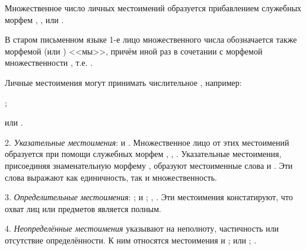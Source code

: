 Множественное число личных местоимений образуется прибавлением служебных морфем , ,  или .

В старом письменном языке 1-е лицо множественного числа обозначается также морфемой  (или ) <<мы>>, причём иной раз в сочетании с морфемой множественности , т.е. .

Личные местоимения могут принимать числительное , например:
\begin{prfsample}
    \item {};
    \item {} или .
\end{prfsample}

2. \emph{Указательные местоимения}:  и . Множественное лицо от этих местоимений образуется при помощи служебных морфем , , . Указательные местоимения, присоединяя знаменательную морфему , образуют местоименные слова  и . Эти слова выражают как единичность, так и множественность.

3. \emph{Определительные местоимения}: ;  и ; , . Эти местоимения констатируют, что охват лиц или предметов является полным.

4. \emph{Неопределённые местоимения} указывают на неполноту, частичность или отсутствие определённости. К ним относятся местоимения  и ;  или ; .

